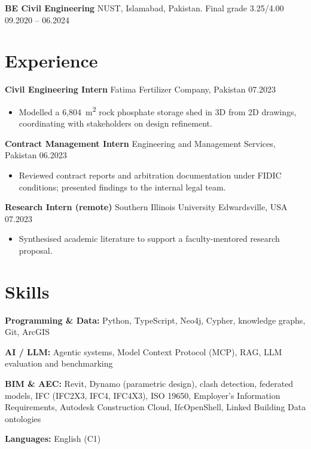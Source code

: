 \documentclass[a4paper,10.5pt]{article}
\newcommand{\datefill}{\dotfill}
\newcommand{\entry}[3]{\vspace{2.5pt}\noindent\textbf{#1} \textbar{} #2 \datefill{} #3\par\vspace{0.5pt}}
\newcommand{\skillrow}[2]{\noindent\textbf{#1:} #2\par\vspace{1pt}}
\begin{document}
\entry{BE Civil Engineering}{NUST, Islamabad, Pakistan. Final grade 3.25/4.00}{09.2020 -- 06.2024}

\section{Experience}
\entry{Civil Engineering Intern}{Fatima Fertilizer Company, Pakistan}{07.2023}
\begin{itemize}
  \item Modelled a 6,804~m\textsuperscript{2} rock phosphate storage shed in 3D from
        2D drawings, coordinating with stakeholders on design refinement.
\end{itemize}

\entry{Contract Management Intern}{Engineering and Management Services, Pakistan}{06.2023}
\begin{itemize}
  \item Reviewed contract reports and arbitration documentation under FIDIC
        conditions; presented findings to the internal legal team.
\end{itemize}

\entry{Research Intern (remote)}{Southern Illinois University Edwardsville, USA}{07.2023}
\begin{itemize}
  \item Synthesised academic literature to support a faculty-mentored research proposal.
\end{itemize}

\section{Skills}

\skillrow{Programming \& Data}{Python, TypeScript, Neo4j, Cypher, knowledge graphs, Git, ArcGIS}
\skillrow{AI / LLM}{Agentic systems, Model Context Protocol (MCP), RAG, LLM evaluation and benchmarking}
\skillrow{BIM \& AEC}{Revit, Dynamo (parametric design), clash detection, federated models, IFC (IFC2X3, IFC4, IFC4X3), ISO 19650, Employer's Information Requirements, Autodesk Construction Cloud, IfcOpenShell, Linked Building Data ontologies}

\skillrow{Languages}{English (C1)}
\end{document}
